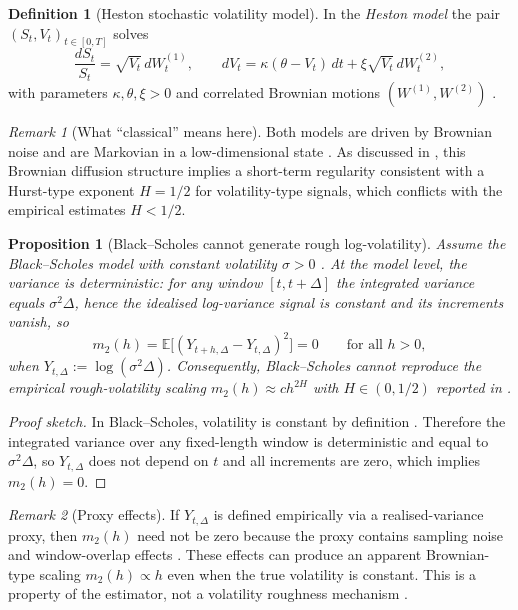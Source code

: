\documentclass[12pt,a4paper]{article}
\theoremstyle{definition}
\newtheorem{definition}{Definition}[section]
\theoremstyle{plain}
\newtheorem{proposition}{Proposition}[section]
\theoremstyle{remark}
\newtheorem{remark}{Remark}[section]
\theoremstyle{plain}
\begin{document}
\begin{definition}[Heston stochastic volatility model]
\label{def:heston_model}
In the \emph{Heston model} the pair $(S_t,V_t)_{t\in[0,T]}$ solves
\[
\frac{dS_t}{S_t} = \sqrt{V_t}\, dW_t^{(1)},
\qquad
dV_t = \kappa(\theta - V_t)\,dt + \xi \sqrt{V_t}\, dW_t^{(2)},
\]
with parameters $\kappa,\theta,\xi>0$ and correlated Brownian motions $(W^{(1)},W^{(2)})$ \cite{Heston1993}.
\end{definition}

\begin{remark}[What ``classical'' means here]
\label{rem:classical_means_brownian}
Both models are driven by Brownian noise and are Markovian in a low-dimensional state \cite{BlackScholes1973,Heston1993}. 
As discussed in \cite{GatheralRough}, this Brownian diffusion structure implies a short-term regularity consistent with a Hurst-type exponent $H=1/2$ for volatility-type signals, which conflicts with the empirical estimates $H<1/2$.
\end{remark}

\begin{proposition}[Black--Scholes cannot generate rough log-volatility]
\label{prop:bs_no_roughness}
Assume the Black--Scholes model with constant volatility $\sigma>0$ \cite{BlackScholes1973}. 
At the model level, the variance is deterministic: for any window $[t,t+\Delta]$ the integrated variance equals $\sigma^2\Delta$, hence the idealised log-variance signal is constant and its increments vanish, so
\[
m_2(h)=\mathbb{E}\bigl[(Y_{t+h,\Delta}-Y_{t,\Delta})^2\bigr]=0
\qquad\text{for all }h>0,
\]
when $Y_{t,\Delta}:=\log(\sigma^2\Delta)$.
Consequently, Black--Scholes cannot reproduce the empirical rough-volatility scaling $m_2(h)\approx c h^{2H}$ with $H\in(0,1/2)$ reported in \cite{GatheralRough}.
\end{proposition}

\begin{proof}[Proof sketch]
In Black--Scholes, volatility is constant by definition \cite{BlackScholes1973}. 
Therefore the integrated variance over any fixed-length window is deterministic and equal to $\sigma^2\Delta$, so $Y_{t,\Delta}$ does not depend on $t$ and all increments are zero, which implies $m_2(h)=0$.
\end{proof}

\begin{remark}[Proxy effects]
\label{rem:bs_proxy_effect}
If $Y_{t,\Delta}$ is defined empirically via a realised-variance proxy, then $m_2(h)$ need not be zero because the proxy contains sampling noise and window-overlap effects \cite{GatheralRough}. 
These effects can produce an apparent Brownian-type scaling $m_2(h)\propto h$ even when the true volatility is constant.
This is a property of the estimator, not a volatility roughness mechanism \cite{GatheralRough}.
\end{remark}
\end{document}
